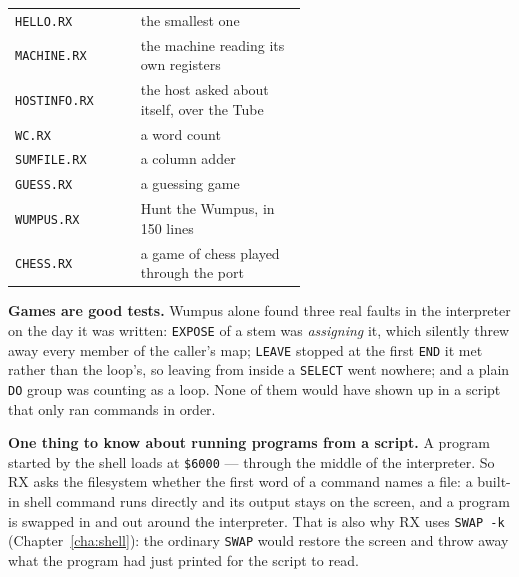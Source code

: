 \begin{center}
\small
\begin{tabular}{@{}l >{\raggedright\arraybackslash}p{0.58\linewidth}@{}}
\toprule
\texttt{HELLO.RX} & the smallest one \\
\texttt{MACHINE.RX} & the machine reading its own registers \\
\texttt{HOSTINFO.RX} & the host asked about itself, over the Tube \\
\texttt{WC.RX} & a word count \\
\texttt{SUMFILE.RX} & a column adder \\
\texttt{GUESS.RX} & a guessing game \\
\texttt{WUMPUS.RX} & Hunt the Wumpus, in 150 lines \\
\texttt{CHESS.RX} & a game of chess played through the port \\
\bottomrule
\end{tabular}
\end{center}

\begin{aside}
\textbf{Games are good tests.} Wumpus alone found three real faults in
the interpreter on the day it was written: \verb|EXPOSE| of a stem was
\emph{assigning} it, which silently threw away every member of the
caller's map; \verb|LEAVE| stopped at the first \verb|END| it met rather
than the loop's, so leaving from inside a \verb|SELECT| went nowhere;
and a plain \verb|DO| group was counting as a loop. None of them would
have shown up in a script that only ran commands in order.
\end{aside}

\begin{aside}
\textbf{One thing to know about running programs from a script.} A
program started by the shell loads at \texttt{\$6000} --- through the
middle of the interpreter. So RX asks the filesystem whether the first
word of a command names a file: a built-in shell command runs directly
and its output stays on the screen, and a program is swapped in and out
around the interpreter. That is also why RX uses \verb|SWAP -k|
(Chapter~\ref{cha:shell}): the ordinary \verb|SWAP| would restore the
screen and throw away what the program had just printed for the script
to read.
\end{aside}

